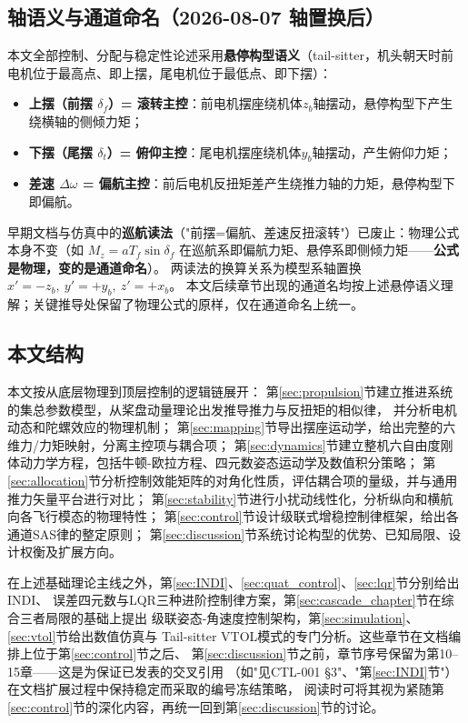 

\subsection{轴语义与通道命名（2026-08-07 轴置换后）}
\label{sec:axis_semantics}

本文全部控制、分配与稳定性论述采用\textbf{悬停构型语义}（tail-sitter，机头朝天时前电机位于最高点、即上摆，尾电机位于最低点、即下摆）：
\begin{itemize}
    \item \textbf{上摆（前摆 $\delta_f$）= 滚转主控}：前电机摆座绕机体$z_b$轴摆动，悬停构型下产生绕横轴的侧倾力矩；
    \item \textbf{下摆（尾摆 $\delta_t$）= 俯仰主控}：尾电机摆座绕机体$y_b$轴摆动，产生俯仰力矩；
    \item \textbf{差速 $\Delta\omega$ = 偏航主控}：前后电机反扭矩差产生绕推力轴的力矩，悬停构型下即偏航。
\end{itemize}
早期文档与仿真中的\textbf{巡航读法}（"前摆=偏航、差速反扭滚转"）已废止：物理公式本身不变（如
$M_z=aT_f\sin\delta_f$ 在巡航系即偏航力矩、悬停系即侧倾力矩——\textbf{公式是物理，变的是通道命名}）。
两读法的换算关系为模型系轴置换 $x'=-z_b,\ y'=+y_b,\ z'=+x_b$。
本文后续章节出现的通道名均按上述悬停语义理解；关键推导处保留了物理公式的原样，仅在通道命名上统一。

\subsection{本文结构}

本文按从底层物理到顶层控制的逻辑链展开：
第\ref{sec:propulsion}节建立推进系统的集总参数模型，从桨盘动量理论出发推导推力与反扭矩的相似律，
并分析电机动态和陀螺效应的物理机制；
第\ref{sec:mapping}节导出摆座运动学，给出完整的六维力/力矩映射，分离主控项与耦合项；
第\ref{sec:dynamics}节建立整机六自由度刚体动力学方程，包括牛顿-欧拉方程、四元数姿态运动学及数值积分策略；
第\ref{sec:allocation}节分析控制效能矩阵的对角化性质，评估耦合项的量级，并与通用推力矢量平台进行对比；
第\ref{sec:stability}节进行小扰动线性化，分析纵向和横航向各飞行模态的物理特性；
第\ref{sec:control}节设计级联式增稳控制律框架，给出各通道SAS律的整定原则；
第\ref{sec:discussion}节系统讨论构型的优势、已知局限、设计权衡及扩展方向。

在上述基础理论主线之外，第\ref{sec:INDI}、\ref{sec:quat_control}、\ref{sec:lqr}节分别给出INDI、
误差四元数与LQR三种进阶控制律方案，第\ref{sec:cascade_chapter}节在综合三者局限的基础上提出
级联姿态-角速度控制架构，第\ref{sec:simulation}、\ref{sec:vtol}节给出数值仿真与
Tail-sitter VTOL模式的专门分析。这些章节在文档编排上位于第\ref{sec:control}节之后、
第\ref{sec:discussion}节之前，章节序号保留为第10--15章——这是为保证已发表的交叉引用
（如"见CTL-001 §3"、"第\ref{sec:INDI}节"）在文档扩展过程中保持稳定而采取的编号冻结策略，
阅读时可将其视为紧随第\ref{sec:control}节的深化内容，再统一回到第\ref{sec:discussion}节的讨论。
